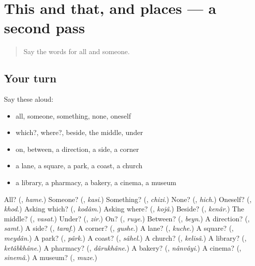 \section[(dialogue)]{This and that, and places — a second pass}

\label{lesson:FA-R88-second-pass-this-and-that-and-places}



\begin{quote}
Say the words for all and someone.
\end{quote}

\subsection*{Your turn}
Say these aloud:

\begin{itemize}
\raggedright
  \item all, someone, something, none, oneself
  \item which?, where?, beside, the middle, under
  \item on, between, a direction, a side, a corner
  \item a lane, a square, a park, a coast, a church
  \item a library, a pharmacy, a bakery, a cinema, a museum
\end{itemize}

\begin{tcolorbox}[breakable,colback=teal!4,colframe=teal!35!black,title={Before you move on}]
All? (\textbf{}, \emph{hame}.) Someone? (\textbf{}, \emph{kasi}.) Something? (\textbf{}, \emph{chizi}.) None? (\textbf{}, \emph{hich}.) Oneself? (\textbf{}, \emph{khod}.) Asking which? (\textbf{}, \emph{kodâm}.) Asking where? (\textbf{}, \emph{kojâ}.) Beside? (\textbf{}, \emph{kenâr}.) The middle? (\textbf{}, \emph{vasat}.) Under? (\textbf{}, \emph{zir}.) On? (\textbf{}, \emph{ruye}.) Between? (\textbf{}, \emph{beyn}.) A direction? (\textbf{}, \emph{samt}.) A side? (\textbf{}, \emph{taraf}.) A corner? (\textbf{}, \emph{gushe}.) A lane? (\textbf{}, \emph{kuche}.) A square? (\textbf{}, \emph{meydân}.) A park? (\textbf{}, \emph{pârk}.) A coast? (\textbf{}, \emph{sâhel}.) A church? (\textbf{}, \emph{kelisâ}.) A library? (\textbf{}, \emph{ketâbkhâne}.) A pharmacy? (\textbf{}, \emph{dârukhâne}.) A bakery? (\textbf{}, \emph{nânvâyi}.) A cinema? (\textbf{}, \emph{sinemâ}.) A museum? (\textbf{}, \emph{muze}.)
\end{tcolorbox}
